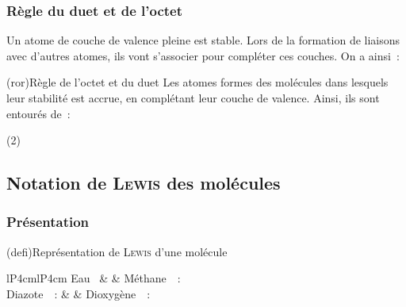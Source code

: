 \documentclass[../../main/main.tex]{subfiles}
\begin{document}
\subsubsection{Règle du duet et de l'octet}
Un atome de couche de valence pleine est stable. Lors de la formation de
liaisons avec d'autres atomes, ils vont s'associer pour compléter ces couches.
On a ainsi~:

\begin{tcb*}(ror){Règle de l'octet et du duet}
	Les atomes formes des molécules dans lesquels leur stabilité est accrue, en
	complétant leur couche de valence. Ainsi, ils sont entourés de~:
	\begin{tasks}(2)
		\task {}
		\task {}
	\end{tasks}
\end{tcb*}

\subsection{Notation de \textsc{Lewis} des molécules}
\subsubsection{Présentation}

\begin{tcb*}(defi){Représentation de \textsc{Lewis} d'une molécule}
\end{tcb*}

\begin{table}[ht]
	\centering
	\caption{Représentations de \textsc{Lewis} de molécules}
	\begin{tabular}{lP{4cm}lP{4cm}}
		\toprule
		Eau~
		 &
		 &
		Méthane~~:
		\\[1em]
		Diazote~~:
		 &
		 &
		Dioxygène~~:
		\\
		\bottomrule
	\end{tabular}
	\label{tab:lewismol}
\end{table}
\end{document}

